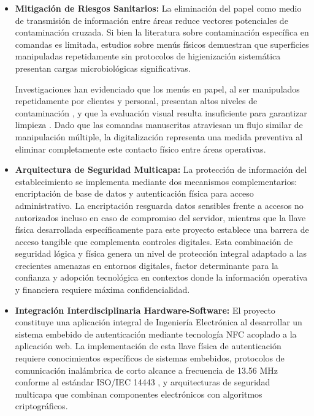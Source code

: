 \begin{itemize}
	\item \textbf{Mitigación de Riesgos Sanitarios:} 
	La eliminación del papel como medio de transmisión de información entre áreas reduce vectores potenciales de contaminación cruzada. Si bien la literatura sobre contaminación específica en comandas es limitada, estudios sobre menús físicos demuestran que superficies manipuladas repetidamente sin protocolos de higienización sistemática presentan cargas microbiológicas significativas. 
	
	Investigaciones han evidenciado que los menús en papel, al ser manipulados repetidamente por clientes y personal, presentan altos niveles de contaminación \cite{alsallaiy2015}, y que la evaluación visual resulta insuficiente para garantizar limpieza \cite{choi2025}. Dado que las comandas manuscritas atraviesan un flujo similar de manipulación múltiple, la digitalización representa una medida preventiva al eliminar completamente este contacto físico entre áreas operativas.
	
	\item \textbf{Arquitectura de Seguridad Multicapa:} 
	La protección de información del establecimiento se implementa mediante dos mecanismos complementarios: encriptación de base de datos y autenticación física para acceso administrativo. La encriptación resguarda datos sensibles frente a accesos no autorizados incluso en caso de compromiso del servidor, mientras que la llave física desarrollada específicamente para este proyecto establece una barrera de acceso tangible que complementa controles digitales. Esta combinación de seguridad lógica y física genera un nivel de protección integral adaptado a las crecientes amenazas en entornos digitales, factor determinante para la confianza y adopción tecnológica en contextos donde la información operativa y financiera requiere máxima confidencialidad.
	
	\item \textbf{Integración Interdisciplinaria Hardware-Software:} 
	El proyecto constituye una aplicación integral de Ingeniería Electrónica al desarrollar un sistema embebido de autenticación mediante tecnología NFC acoplado a la aplicación web. La implementación de esta llave física de autenticación requiere conocimientos específicos de sistemas embebidos, protocolos de comunicación inalámbrica de corto alcance a frecuencia de 13.56 MHz conforme al estándar ISO/IEC 14443 \cite{Liyanage2018}, y arquitecturas de seguridad multicapa que combinan componentes electrónicos con algoritmos criptográficos. 
	

\end{itemize}
